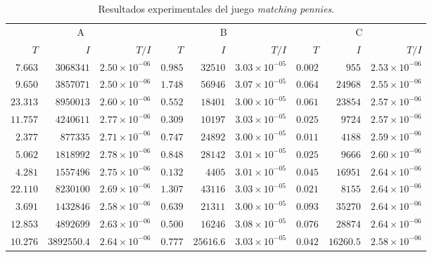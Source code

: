 \begin{table}[h]
    \centering
    \caption{Resultados experimentales del juego \textit{matching pennies}.}
    \label{tab:resultados-matching-pennies}
    \scriptsize
    \begin{tabular}{r r r r r r r r r}
    \toprule
    \multicolumn{3}{c}{A} & \multicolumn{3}{c}{B} & \multicolumn{3}{c}{C} \\ \cmidrule(r){1-3} \cmidrule(lr){4-6} \cmidrule(l){7-9}
    $T$ & $I$ & $T/I$ & $T$ & $I$ & $T/I$ & $T$ & $I$ & $T/I$ \\  \cmidrule(r){1-3} \cmidrule(lr){4-6} \cmidrule(l){7-9}
	$7.663$ & $3068341$ & $2.50 {\times} 10^{-06}$ & $0.985$ & $32510$ & $3.03 {\times} 10^{-05}$ & $0.002$ & $955$ & $2.53 {\times} 10^{-06}$ \\
	$9.650$ & $3857071$ & $2.50 {\times} 10^{-06}$ & $1.748$ & $56946$ & $3.07 {\times} 10^{-05}$ & $0.064$ & $24968$ & $2.55 {\times} 10^{-06}$ \\
	$23.313$ & $8950013$ & $2.60 {\times} 10^{-06}$ & $0.552$ & $18401$ & $3.00 {\times} 10^{-05}$ & $0.061$ & $23854$ & $2.57 {\times} 10^{-06}$ \\
	$11.757$ & $4240611$ & $2.77 {\times} 10^{-06}$ & $0.309$ & $10197$ & $3.03 {\times} 10^{-05}$ & $0.025$ & $9724$ & $2.57 {\times} 10^{-06}$ \\
	$2.377$ & $877335$ & $2.71 {\times} 10^{-06}$ & $0.747$ & $24892$ & $3.00 {\times} 10^{-05}$ & $0.011$ & $4188$ & $2.59 {\times} 10^{-06}$ \\
	$5.062$ & $1818992$ & $2.78 {\times} 10^{-06}$ & $0.848$ & $28142$ & $3.01 {\times} 10^{-05}$ & $0.025$ & $9666$ & $2.60 {\times} 10^{-06}$ \\
	$4.281$ & $1557496$ & $2.75 {\times} 10^{-06}$ & $0.132$ & $4405$ & $3.01 {\times} 10^{-05}$ & $0.045$ & $16951$ & $2.64 {\times} 10^{-06}$ \\
	$22.110$ & $8230100$ & $2.69 {\times} 10^{-06}$ & $1.307$ & $43116$ & $3.03 {\times} 10^{-05}$ & $0.021$ & $8155$ & $2.64 {\times} 10^{-06}$ \\
	$3.691$ & $1432846$ & $2.58 {\times} 10^{-06}$ & $0.639$ & $21311$ & $3.00 {\times} 10^{-05}$ & $0.093$ & $35270$ & $2.64 {\times} 10^{-06}$ \\
	$12.853$ & $4892699$ & $2.63 {\times} 10^{-06}$ & $0.500$ & $16246$ & $3.08 {\times} 10^{-05}$ & $0.076$ & $28874$ & $2.64 {\times} 10^{-06}$ \\ \cmidrule(r){1-3} \cmidrule(lr){4-6} \cmidrule(l){7-9}
	$10.276$ & $3892550.4$ & $2.64 {\times} 10^{-06}$ & $0.777$ & $25616.6$ & $3.03 {\times} 10^{-05}$ & $0.042$ & $16260.5$ & $2.58 {\times} 10^{-06}$ \\ \bottomrule
    \end{tabular}
\end{table}

